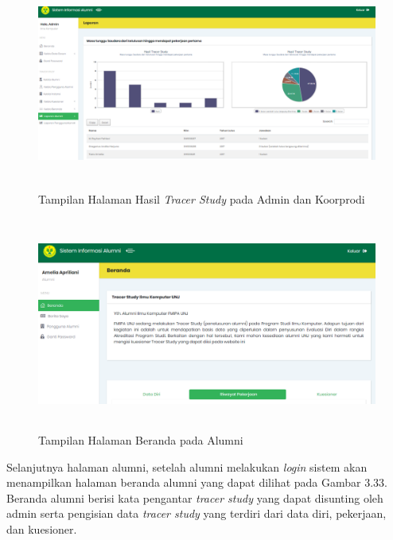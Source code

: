 
\begin{figure}[H]
	\centering
	\includegraphics[width=14cm,height=7cm]{gambar/tampilan/admin_hasilLaporanAlumni}
	\caption{Tampilan Halaman Hasil \textit{Tracer Study} pada Admin dan Koorprodi}
	\label{ui_adminHasilLaporanAlumni}
\end{figure}

\begin{figure}[H]
	\centering
	\includegraphics[width=14cm,height=7cm]{gambar/tampilan/alumni_beranda}
	\caption{Tampilan Halaman Beranda pada Alumni }
	\label{ui_alumniBeranda}
\end{figure}

Selanjutnya halaman alumni, setelah alumni melakukan \textit{login} sistem akan menampilkan halaman beranda alumni yang dapat dilihat pada Gambar 3.33. Beranda alumni berisi kata pengantar \textit{tracer study} yang dapat disunting oleh admin serta pengisian data \textit{tracer study} yang terdiri dari data diri, pekerjaan, dan kuesioner.  

